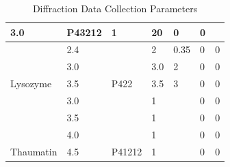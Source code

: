 \begin{table}[h]
{\begin{tabular}{|l|l|l|l|l|l|l|}
  3.0 &
  P43212 &
  1 &
  20 &
  0 &
  0 \\ \hline
 &
  2.4 &
   &
  2 &
  0.35 &
  0 &
  0 \\ \cline{2-2} \cline{4-7} 
 &
  3.0 &
   &
  3.0 &
  2 &
  0 &
  0 \\ \cline{2-2} \cline{4-7} 
\multirow{-3}{*}{Lysozyme} &
  3.5 &
  \multirow{-3}{*}{P422} &
  3.5 &
  3 &
  0 &
  0 \\ \hline
 &
  3.0 &
   &
  1 &
   &
  0 &
  0 \\ \cline{2-2} \cline{4-7} 
 &
  3.5 &
   &
  1 &
   &
  0 &
  0 \\ \cline{2-2} \cline{4-7} 
 &
  4.0 &
   &
  1 &
   &
  0 &
  0 \\ \cline{2-2} \cline{4-7} 
\multirow{-4}{*}{Thaumatin} &
  4.5 &
  \multirow{-4}{*}{P41212} &
  1 &
   &
  0 &
  0 \\ \hline
\end{tabular}
}
\caption{Diffraction Data Collection Parameters}
\end{table}








